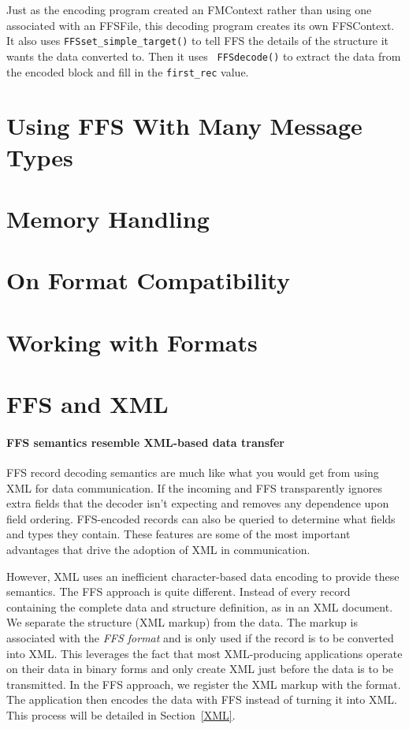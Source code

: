 Just as the encoding program created an FMContext rather than using one
associated with an FFSFile, this decoding program creates its own
FFSContext.  It also uses {\tt FFSset\_simple\_target()} to tell FFS the
details of the structure it wants the data converted to.  Then it uses {\tt
  FFSdecode()} to extract the data from the encoded block and fill in the
{\tt first\_rec} value. 
\section{Using FFS With Many Message Types}
\section{Memory Handling}
\section{On Format Compatibility}
\section{Working with Formats\label{sec:formats}}
\section{FFS and XML}

\paragraph{FFS semantics resemble XML-based data transfer} FFS record
decoding semantics are much like what you would get from using XML for data
communication.  
If the incoming and
FFS transparently ignores extra fields that the decoder
isn't expecting and removes any dependence upon field ordering.  FFS-encoded
records can also be queried to determine what fields and types they contain.
These features are some of the most important advantages that drive the
adoption of XML in communication.

However, XML uses an inefficient character-based data encoding to provide
these semantics.  The FFS approach is quite different.  Instead of every
record containing the complete data and structure definition, as in an XML
document.  We separate the structure (XML markup) from the data.  The markup
is associated with the {\em FFS format} and is only used if the record is to
be converted into XML.  This leverages the fact that most XML-producing
applications operate on their data in binary forms and only create XML just
before the data is to be transmitted.  In the FFS approach, we register the
XML markup with the format.  The application then encodes the data with FFS
instead of turning it into XML.  This process will be detailed in
Section~\ref{XML}.

